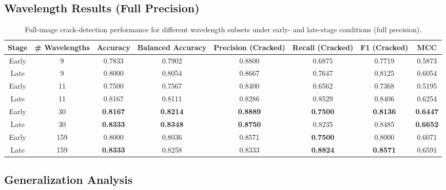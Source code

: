 \subsection{Wavelength Results (Full Precision)}
\label{app:wavelength_full_precision}

\begin{table}[!htbp]
\centering
\caption[Full-image performance by wavelength subset (full precision)]{Full-image crack-detection performance for different wavelength subsets under early- and late-stage conditions (full precision).}
\label{tab:full_image_wavelength_results_full}
\begin{adjustbox}{max width=\linewidth,center}
\begin{tabular}{cccccccc}
\toprule
Stage & \# Wavelengths & Accuracy & Balanced Accuracy & Precision (Cracked) & Recall (Cracked) & F1 (Cracked) & MCC \\
\midrule
Early & 9 & 0.7833 & 0.7902 & 0.8800 & 0.6875 & 0.7719 & 0.5873 \\
Late  & 9 & 0.8000 & 0.8054 & 0.8667 & 0.7647 & 0.8125 & 0.6054 \\
\midrule
Early & 11 & 0.7500 & 0.7567 & 0.8400 & 0.6562 & 0.7368 & 0.5195 \\
Late  & 11 & 0.8167 & 0.8111 & 0.8286 & 0.8529 & 0.8406 & 0.6254 \\
\midrule
Early & 30 & \textbf{0.8167} & \textbf{0.8214} & \textbf{0.8889} & \textbf{0.7500} & \textbf{0.8136} & \textbf{0.6447} \\
Late  & 30 & \textbf{0.8333} & \textbf{0.8348} & \textbf{0.8750} & 0.8235 & 0.8485 & \textbf{0.6652} \\
\midrule
Early & 159 & 0.8000 & 0.8036 & 0.8571 & \textbf{0.7500} & 0.8000 & 0.6071 \\
Late  & 159 & \textbf{0.8333} & 0.8258 & 0.8333 & \textbf{0.8824} & \textbf{0.8571} & 0.6591 \\
\bottomrule
\end{tabular}
\end{adjustbox}
\end{table}

\subsection{Generalization Analysis}
\label{app:wavelength_generalization_analysis}

